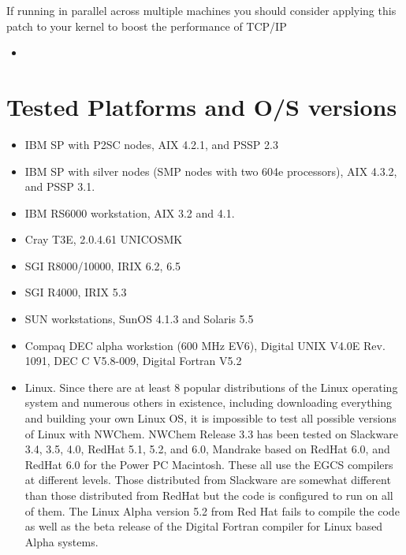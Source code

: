 If running in parallel across multiple machines you should consider
applying this patch to your kernel to boost the performance of TCP/IP
\begin{itemize}
\item {}
\end{itemize}

\section{Tested Platforms and O/S versions}

\begin{itemize}
\item IBM SP with P2SC nodes,  AIX 4.2.1, and PSSP 2.3
\item IBM SP with silver nodes (SMP nodes with two 604e processors),
AIX 4.3.2, and PSSP 3.1.
\item IBM RS6000 workstation, AIX 3.2 and 4.1.
\item Cray T3E, 2.0.4.61 UNICOSMK
\item SGI R8000/10000, IRIX 6.2, 6.5
\item SGI R4000, IRIX 5.3
\item SUN workstations, SunOS 4.1.3 and Solaris 5.5
\item Compaq DEC alpha workstion (600 MHz EV6), Digital UNIX V4.0E
Rev. 1091, DEC C V5.8-009, Digital Fortran V5.2
\item Linux. Since there are at least 8 popular distributions of the
Linux operating system and numerous others in existence, including
downloading everything and building your own Linux OS, it is
impossible to test all possible versions of Linux with NWChem. NWChem
Release 3.3 has been tested on Slackware 3.4, 3.5, 4.0, RedHat 5.1,
5.2, and 6.0, Mandrake based on RedHat 6.0, and RedHat 6.0 for the
Power PC Macintosh.  These all use the EGCS compilers at different
levels.  Those distributed from Slackware are somewhat different than
those distributed from RedHat but the code is configured to run on all
of them.  The Linux Alpha version 5.2 from Red Hat fails to compile
the code as well as the beta release of the Digital Fortran compiler
for Linux based Alpha systems.

\end{itemize}
